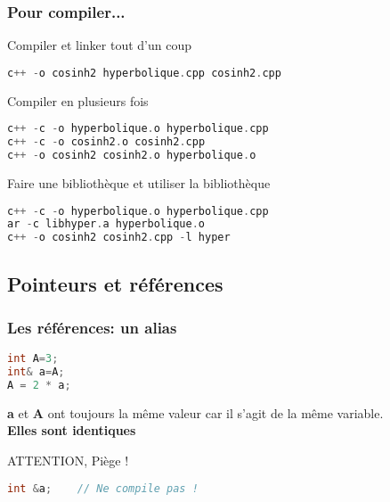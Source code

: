 \documentclass{beamer}
\begin{document}
\begin{frame}[fragile=singleslide,shrink=20]
\frametitle{Pour compiler...}

\begin{block}{Compiler et linker tout d'un coup}
\begin{lstlisting}[language=c++]
c++ -o cosinh2 hyperbolique.cpp cosinh2.cpp
\end{lstlisting}
\end{block}

\begin{block}{Compiler en plusieurs fois}
\begin{lstlisting}[language=c++]
c++ -c -o hyperbolique.o hyperbolique.cpp
c++ -c -o cosinh2.o cosinh2.cpp
c++ -o cosinh2 cosinh2.o hyperbolique.o
\end{lstlisting}
\end{block}

\begin{block}{Faire une bibliothèque et utiliser la bibliothèque}
\begin{lstlisting}[language=c++]
c++ -c -o hyperbolique.o hyperbolique.cpp
ar -c libhyper.a hyperbolique.o
c++ -o cosinh2 cosinh2.cpp -l hyper
\end{lstlisting}
\end{block}

\end{frame}

\subsection{Pointeurs et références}

\begin{frame}[fragile=singleslide,shrink=20]
\frametitle{Les références: un alias}

\begin{lstlisting}[language=c++]
int A=3;
int& a=A;
A = 2 * a;
\end{lstlisting}

\textbf{a} et \textbf{A} ont toujours la même valeur car il s'agit de la même variable. \\
\textbf{Elles sont identiques}

\begin{block}{ATTENTION, Piège !}
\begin{lstlisting}[language=c++]
int &a;    // Ne compile pas ! 
\end{lstlisting}
\end{block}
\end{frame}
\end{document}
